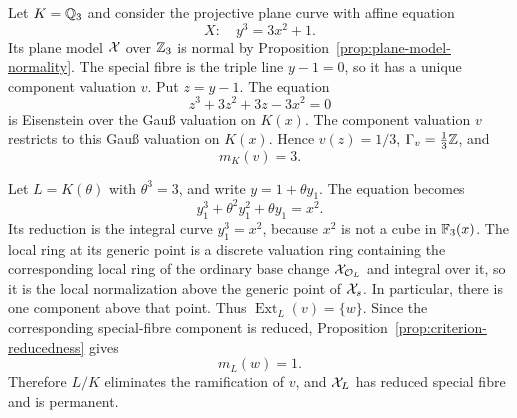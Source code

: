\begin{example}\label{ex:cubic-elimination}
    Let $K=\mathbb Q_3$ and consider the projective plane curve with affine equation
    \[
        X:\quad y^3=3x^2+1.
    \]
    Its plane model $\mathcal X$ over $\mathbb Z_3$ is normal by Proposition~\ref{prop:plane-model-normality}.
    The special fibre is the triple line $y-1=0$, so it has a unique component valuation $v$.
    Put $z=y-1$.
    The equation
    \[
        z^3+3z^2+3z-3x^2=0
    \]
    is Eisenstein over the Gauß valuation on $K(x)$.
    The component valuation $v$ restricts to this Gauß valuation on $K(x)$.
    Hence $v(z)=1/3$, $\Gamma_v=\frac13\mathbb Z$, and
    \[
        m_K(v)=3.
    \]

    Let $L=K(\theta)$ with $\theta^3=3$, and write $y=1+\theta y_1$.
    The equation becomes
    \[
        y_1^3+\theta^2y_1^2+\theta y_1=x^2.
    \]
    Its reduction is the integral curve $y_1^3=x^2$, because $x^2$ is not a cube in $\mathbb F_3(x)$.
    The local ring at its generic point is a discrete valuation ring containing the corresponding local ring of the ordinary base change $\mathcal X_{\mathcal O_L}$ and integral over it, so it is the local normalization above the generic point of $\mathcal X_s$.
    In particular, there is one component above that point.
    Thus $\operatorname{Ext}_L(v)=\{w\}$.
    Since the corresponding special-fibre component is reduced, Proposition~\ref{prop:criterion-reducedness} gives
    \[
        m_L(w)=1.
    \]
    Therefore $L/K$ eliminates the ramification of $v$, and $\mathcal X_L$ has reduced special fibre and is permanent.
\end{example}

